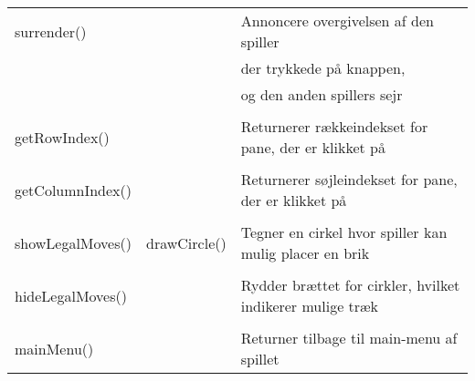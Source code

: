 \begin{table}[H]
\begin{tabular}{lll}
surrender() & & Annoncere overgivelsen af den spiller\\
& & der trykkede på knappen,\\
 & & og den anden spillers sejr\\
\\
getRowIndex()& & Returnerer rækkeindekset for pane, der er klikket på\\
\\
getColumnIndex()& & Returnerer søjleindekset for pane, der er klikket på\\
\\
showLegalMoves() & drawCircle() & Tegner en cirkel hvor spiller kan mulig placer en brik\\
\\
hideLegalMoves() & & Rydder brættet for cirkler, hvilket indikerer mulige træk\\
\\
mainMenu() & & Returner tilbage til main-menu af spillet\\

\bottomrule
\end{tabular}
\end{table}

